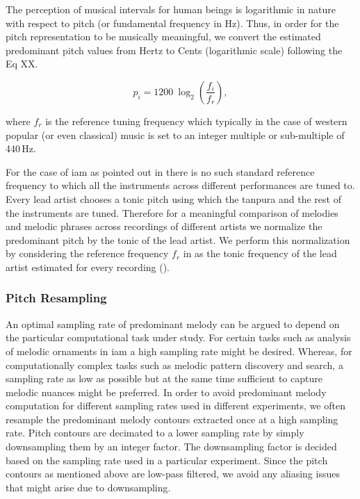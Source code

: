 {The perception of musical intervals for human beings is logarithmic in nature with respect to pitch (or fundamental frequency in Hz). Thus, in order for the pitch representation to be musically meaningful,  we convert the estimated predominant pitch values from Hertz to Cents (logarithmic scale) following the Eq XX.

\begin{equation}
\label{eq:hertz_to_cent_conversion}	
p_i = 1200~\log_2\left(\frac{f_i}{f_r}\right) ,
\end{equation}

\noindent where $f_r$ is the reference tuning frequency which typically in the case of western popular (or even classical) music is set to an integer multiple or sub-multiple of 440\,Hz. 

For the case of \gls{iam} as pointed out in  there is no such standard reference frequency to which all the instruments across different performances are tuned to. Every lead artist chooses a tonic pitch using which the \gls{tanpura} and the rest of the instruments are tuned. Therefore for a meaningful comparison of melodies and melodic phrases across recordings of different artists we normalize the predominant pitch by the tonic of the lead artist. We perform this normalization by considering the reference frequency $f_r$ in  as the tonic frequency of the lead artist estimated for every recording ().  


\subsubsection{Pitch Resampling}
\label{sec:data_processing_pitch_resampling}

An optimal sampling rate of predominant melody can be argued to depend on the particular computational task under study. For certain tasks such as analysis of melodic ornaments in \gls{iam} a high sampling rate might be desired. Whereas, for computationally complex tasks such as melodic pattern discovery and search, a sampling rate as low as possible but at the same time sufficient to capture melodic nuances might be preferred. In order to avoid predominant melody computation for different sampling rates used in different experiments, we often resample the predominant melody contours extracted once at a high sampling rate. Pitch contours are decimated to a lower sampling rate by simply downsampling them by an integer factor. The downsampling factor is decided based on the sampling rate used in a particular experiment. Since the pitch contours as mentioned above are low-pass filtered, we avoid any aliasing issues that might arise due to downsampling. 

}
